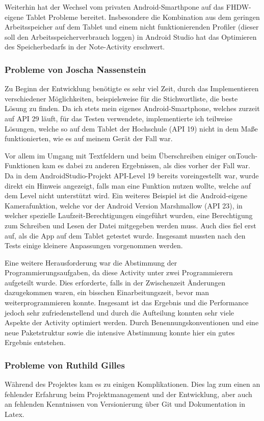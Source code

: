 Weiterhin hat der Wechsel vom privaten Android-Smarthpone auf das FHDW-eigene Tablet Probleme bereitet. Insbesondere die Kombination aus dem geringen Arbeitsspeicher auf dem Tablet und einem nicht funktionierenden Profiler (dieser soll den Arbeitsspeicherverbrauch loggen) in Android Studio hat das Optimieren des Speicherbedarfs in der Note-Activity erschwert.

\subsubsection{Probleme von Joscha Nassenstein}
Zu Beginn der Entwicklung benötigte es sehr viel Zeit, durch das Implementieren verschiedener Möglichkeiten, beispielsweise für die Stichwortliste, die beste Lösung zu finden. Da ich stets mein eigenes Android-Smartphone, welches zurzeit auf API 29 läuft, für das Testen verwendete, implementierte ich teilweise Lösungen, welche so auf dem Tablet der Hochschule (API 19) nicht in dem Maße funktionierten, wie es auf meinem Gerät der Fall war.

Vor allem im Umgang mit Textfeldern und beim Überschreiben einiger onTouch-Funktionen kam es dabei zu anderen Ergebnissen, als dies vorher der Fall war. Da in dem AndroidStudio-Projekt API-Level 19 bereits voreingestellt war, wurde direkt ein Hinweis angezeigt, falls man eine Funktion nutzen wollte, welche auf dem Level nicht unterstützt wird. Ein weiteres Beispiel ist die Android-eigene Kamerafunktion, welche vor der Android Version Marshmallow (API 23), in welcher spezielle Laufzeit-Berechtigungen eingeführt wurden, eine Berechtigung zum Schreiben und Lesen der Datei mitgegeben werden muss. Auch dies fiel erst auf, als die App auf dem Tablet getestet wurde. Insgesamt mussten nach den Tests einige kleinere Anpassungen vorgenommen werden.

Eine weitere Herausforderung war die Abstimmung der Programmierungsaufgaben, da diese Activity unter zwei Programmierern aufgeteilt wurde. Dies erforderte, falls in der Zwischenzeit Änderungen dazugekommen waren, ein bisschen Einarbeitungszeit, bevor man weiterprogrammieren konnte. Insgesamt ist das Ergebnis und die Performance jedoch sehr zufriedenstellend und durch die Aufteilung konnten sehr viele Aspekte der Activity optimiert werden. Durch Benennungskonventionen und eine neue Paketstruktur sowie die intensive Abstimmung konnte hier ein gutes Ergebnis entstehen.

\subsubsection{Probleme von Ruthild Gilles}
Während des Projektes kam es zu einigen Komplikationen. Dies lag zum einen an fehlender Erfahrung beim Projektmanagement und der Entwicklung, aber auch an fehlenden Kenntnissen von Versionierung über Git und Dokumentation in Latex.

